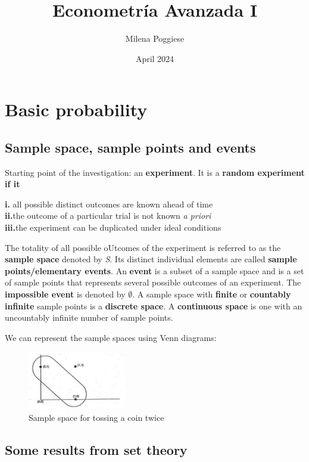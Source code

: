 \documentclass{article}
\title{Econometría Avanzada I}
\author{Milena Poggiese}
\date{April 2024}
\begin{document}

\section{Basic probability}
\subsection{Sample space, sample points and events}
Starting point of the investigation: an \textbf{experiment}. It is a \textbf{random experiment if it}
\begin{description}
    \item[\textbf{i.} all possible distinct outcomes are known ahead of time]
    \item[\textbf{ii.}the outcome of a particular trial is not known \textit{a priori}]
    \item[\textbf{iii.}the experiment can be duplicated under ideal conditions] 
\end{description}

The totality of all possible oUtcomes of the experiment is referred to as the \textbf{sample space} denoted by \textit{S}. Its distinct individual elements are called \textbf{sample points/elementary events}.
An \textbf{event} is a subset of a sample space and is a set of sample points that represents several possible outcomes of an experiment. The \textbf{impossible event} is denoted by $\emptyset$. A sample space with \textbf{finite} or \textbf{countably infinite} sample points is a \textbf{discrete space}. A \textbf{continuous space} is one with an uncountably infinite number of sample points. 

We can represent the sample spaces using Venn diagrams:

\begin{figure}[h]
    \centering
    \includegraphics[height=1in]{pics/venn sample space.jpg}
    \caption{Sample space for tossing a coin twice}
\end{figure}

\subsection{Some results from set theory}
\end{document}
